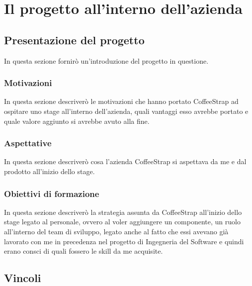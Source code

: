 
\chapter{Il progetto all'interno dell'azienda}
\label{cap:progetto-azienda}

\section{Presentazione del progetto}

In questa sezione fornirò un'introduzione del progetto in questione.

\subsection{Motivazioni}

In questa sezione descriverò le motivazioni che hanno portato CoffeeStrap ad ospitare uno stage all'interno dell'azienda, quali vantaggi esso avrebbe portato e quale valore aggiunto si avrebbe avuto alla fine.

\subsection{Aspettative}

In questa sezione descriverò cosa l'azienda CoffeeStrap si aspettava da me e dal prodotto all'inizio dello stage.

\subsection{Obiettivi di formazione}

In questa sezione descriverò la strategia assunta da CoffeeStrap all'inizio dello stage legato al personale, ovvero al voler aggiungere un componente, un ruolo all'interno del team di sviluppo, legato anche al fatto che essi avevano già lavorato con me in precedenza nel progetto di Ingegneria del Software e quindi erano consci di quali fossero le skill da me acquisite.

\section{Vincoli}

